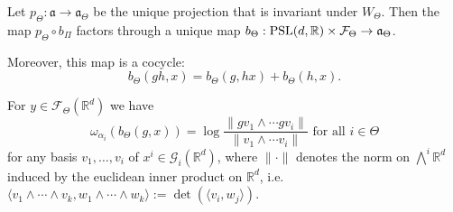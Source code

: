 \documentclass{report}
\begin{document}
\begin{lemma}
    Let $p_\Theta: \mathfrak a \to \mathfrak a_\Theta$ be the unique projection that is invariant under $W_\Theta$.
    Then the map $p_\Theta \circ b_\Pi$ factors through a unique map $b_\Theta: \operatorname{{\mathrm{PSL}}}(d, \mathbb R) \times \mathcal F_\Theta \to \mathfrak a_\Theta$.

    Moreover, this map is a cocycle:
    \[
    b_\Theta(gh, x) = b_\Theta(g, hx) + b_\Theta(h,x).
    \]
\end{lemma}




\begin{lemma}\label{lem:busemann_weight}
For $y \in \mathcal F_\Theta(\mathbb R^d)$ we have    
\[
    \omega_{\mathsf{\alpha}_i}(b_\Theta(g, x)) =
    \log \frac{\| g v_1 \wedge \cdots g v_i \|}{ \| v_1 \wedge \cdots v_i \| }
    \text{ for all } i \in \Theta
\]
for any basis $v_1, \ldots, v_i$ of $x^i \in \mathcal G_i(\mathbb R^d)$, where $\| \cdot \|$ denotes the norm on $\bigwedge^i \mathbb R^d$ induced by the euclidean inner product on $\mathbb R^d$, 
i.e.\ $ \langle v_1 \wedge \cdots \wedge v_k, w_1 \wedge \cdots \wedge w_k \rangle := \det(\langle v_i, w_j \rangle)$.
\end{lemma}
\end{document}
